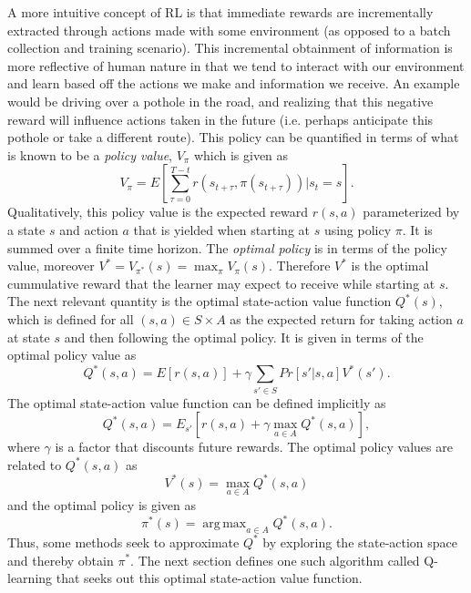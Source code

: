 \documentclass{article} %
\DeclareMathOperator*{\argmax}{arg\,max}
\begin{document}
 A more intuitive concept of RL is that immediate rewards are incrementally extracted through actions made with some environment (as opposed to a batch collection and training scenario). This incremental obtainment of information is more reflective of human nature in that we tend to interact with our environment and learn based off the actions we make and information we receive. An example would be driving over a pothole in the road, and realizing that this negative reward will influence actions taken in the future (i.e. perhaps anticipate this pothole or take a different route). This policy can be quantified in terms of what is known to be a \textit{policy value}, $V_{\pi}$ which is given as 
$$
V_{\pi} = E[\sum_{\tau = 0}^{T-t}r(s_{t+\tau},\pi(s_{t+\tau}))|s_t = s].
$$
Qualitatively, this policy value is the expected reward $r(s,a)$ parameterized by a state $s$ and action $a$ that is yielded when starting at $s$ using policy $\pi$. It is summed over a finite time horizon. The \textit{optimal policy} is in terms of the policy value, moreover $V^{*}=V_{\pi^*}(s) = \max_{\pi} V_{\pi}(s)$. Therefore $V^{*}$ is the optimal cummulative reward that the learner may expect to receive while starting at $s$. The next relevant quantity is the optimal state-action value function $Q^*(s)$, which is defined for all $(s,a) \in S \times A$ as the expected return for taking action $a$ at state $s$ and then following the optimal policy.  It is given in terms of the optimal policy value as
$$
Q^*(s,a) = E[r(s,a)] + \gamma \sum_{s' \in S}Pr[s' | s,a]V^*(s').
$$
The optimal state-action value function can be defined implicitly as
$$
Q^*(s,a) = E_{s'}[r(s,a) + \gamma \max_{a \in A}Q^*(s,a)],
$$
where $\gamma$ is a factor that discounts future rewards.  The optimal policy values are related to $Q^*(s,a)$ as 
$$V^*(s) = \max_{a\in A} Q^*(s,a)$$
and the optimal policy is given as 
$$\pi^*(s) = \argmax_{a\in A} Q^*(s,a).$$
Thus, some methods seek to approximate $Q^*$ by exploring the state-action space and thereby obtain $\pi^*$.
The next section defines one such algorithm called Q-learning that seeks out this optimal state-action value function. 
\end{document}
